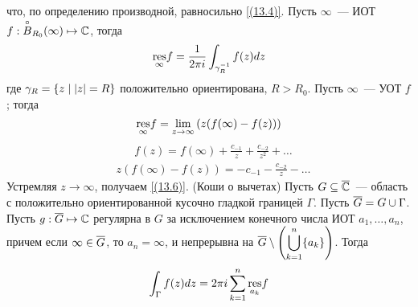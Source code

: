 что, по определению производной, равносильно \eqref{(13.4)}.
\Def
Пусть $\infty$~--- ИОТ $f: \overset{\circ}{B}_{R_0}(\infty) \mapsto \mathbb{C}$, тогда
\begin{equation}\label{(13.5)}
    \underset{\infty}{\mathrm{res}}f = \frac{1}{2\pi i}\int_{\gamma_R^{-1}}f(z)dz
\end{equation}
где $\gamma_R = \left\{{z \mid \left|{z}\right| = R}\right\}$ положительно ориентирована, $R >
R_0$.
\lemma
Пусть $\infty$~--- УОТ $f$; тогда
\begin{equation}\label{(13.6)}
    \underset{\infty}{\mathrm{res}}f = \lim_{z \to \infty} \left( z(f(\infty) - f(z)) \right)
\end{equation}
\pr
\begin{align*}
  & f(z) = f(\infty) + \frac{c_{-1}}{z} + \frac{c_{-2}}{z^2} + \dots
\end{align*}
\begin{align*}
  & z(f(\infty) - f(z)) = -c_{-1} - \frac{c_{-2}}{z} - \dots
\end{align*}
Устремляя $z \to \infty$, получаем \eqref{(13.6)}.
\theorem (Коши о вычетах)
Пусть $G \subseteq \overline{\mathbb{C}}$~--- область с положительно ориентированной кусочно
гладкой границей $\Gamma$. Пусть $\overline{G} = G \cup \Gamma$.
\\
Пусть $g: \overline{G} \mapsto \mathbb{C}$ регулярна в $G$ за исключением конечного числа ИОТ
$a_1, \dots, a_n$, причем если $\infty \in \overline{G}$, то $a_n = \infty$, и
непрерывна на $\overline{G}\setminus \left( \displaystyle \bigcup_{k=1}^n\{a_k\} \right)$.
Тогда
\begin{equation}\label{(13.7)}
    \int_{\Gamma}f(z)dz = 2 \pi i \sum_{k=1}^{n}\underset{a_k}{\mathrm{res}} f
\end{equation}
\pr
~
